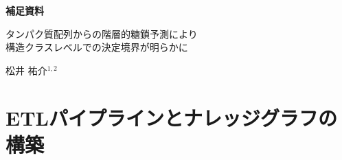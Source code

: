 \documentclass[11pt,a4paper]{ltjsarticle}
\begin{document}
\begin{center}
{\LARGE\bfseries 補足資料}

\vspace{0.5em}
{\large タンパク質配列からの階層的糖鎖予測により\\
構造クラスレベルでの決定境界が明らかに}

\vspace{0.5em}
{\normalsize 松井 祐介$^{1,2}$}
\end{center}

\vspace{1em}
\tableofcontents
\vspace{1em}

\section{ETLパイプラインとナレッジグラフの構築}
\label{sec:etl}
\end{document}

